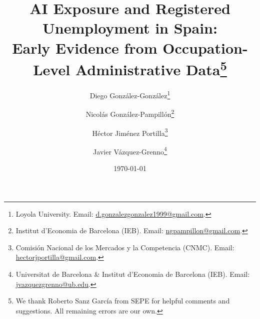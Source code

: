 
\usepackage[utf8]{inputenc}
\usepackage{geometry}
\usepackage{setspace}
\usepackage{booktabs}
\usepackage{threeparttable}
\usepackage{graphicx}
\usepackage{pgfplots}
\pgfplotsset{compat=1.18}
\usepackage{fvextra}
\usepackage{caption}
\usepackage{subcaption}
\usepackage{float}
\usepackage{adjustbox}
\usepackage{amsmath,amssymb}
\usepackage{natbib}
\usepackage{url}
\usepackage{xcolor}
\usepackage{pdflscape}   %
\usepackage{array}       %
\usepackage[colorlinks=true,linkcolor=blue,citecolor=blue,urlcolor=blue]{hyperref}
\usepackage{longtable}
\usepackage{placeins}

\makeatletter
\patchcmd{\LT@output}{\copy\LT@foot\vss}{\copy\LT@foot\vfil}{}{}
\patchcmd{\LT@output}{\copy\LT@foot\vss}{\copy\LT@foot\vfil}{}{}
\makeatother

\captionsetup{font=small, labelfont=bf}
\setlength{\parskip}{0.45em}
\setlength{\parindent}{0pt}
\setlength{\emergencystretch}{2em}

\newcommand{\tabdir}{output/tables}
\newcommand{\panelwidth}{0.70\textwidth}
\newcommand{\descriptivepanelwidth}{0.66\textwidth}
\newcommand{\smallpanelwidth}{0.48\textwidth}
\newcommand{\figdir}{output/figures}

\geometry{margin=1in}
\onehalfspacing
\raggedbottom
\graphicspath{{output/figures/}}

\title{AI Exposure and Registered Unemployment in Spain:\\Early Evidence from Occupation-Level Administrative Data\thanks{We thank Roberto Sanz García from SEPE for helpful comments and suggestions. All remaining errors are our own.}
}


\author{
Diego Gonz\'alez-Gonz\'alez\thanks{Loyola University. Email: \href{mailto:d.gonzalezgonzalez1999@gmail.com}{d.gonzalezgonzalez1999@gmail.com}.%
}
\and
Nicol\'as Gonz\'alez-Pampill\'on\thanks{Institut d'Economia de Barcelona (IEB). Email: \href{mailto:ngpampillon@gmail.com}{ngpampillon@gmail.com}. %
}
\and
H\'ector Jim\'enez Portilla\thanks{Comisi\'on Nacional de los Mercados y la Competencia (CNMC). Email: \href{mailto:hectorjportilla@gmail.com}{hectorjportilla@gmail.com}.}
\and
Javier V\'azquez-Grenno\thanks{Universitat de Barcelona \& Institut d'Economia de Barcelona (IEB). Email: \href{mailto:jvazquezgrenno@ub.edu}{jvazquezgrenno@ub.edu}.%
}
}
\date{\today}


